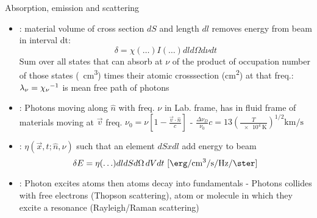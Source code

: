 \begin{frame}{Absorption, emission and scattering}
    \begin{itemize}
        \item {}: material volume of cross section $dS$ and length $dl$ removes energy from beam in interval dt:
            \[\delta=\chi(\ldots)I(\ldots)dld\Omega d\nu dt\]
            Sum over all states that can absorb at $\nu$ of the product of occupation number of those states (\si{\per\cubic\cm}) times their atomic crosssection (\si{\square\cm}) at that freq.: $\lambda_{\nu}={\chi_{\nu}}^{-1}$ is mean free path of photons
        \item {}: Photons moving along $\hat{n}$ with freq. $\nu$ in Lab. frame, has in fluid frame of materials moving at $\vec{v}$ freq. $\nu_0=\nu[1-\frac{\vec{v}\cdot\hat{n}}{c}]$ - $\frac{\Delta\nu_D}{\nu_0}c=13(\frac{T}{\SI{e4}{\kelvin}})^{1/2}\si{\kilo\meter\per\second}$
        \item {}: $\eta(\vec{x},t;\hat{n},\nu)$ such that an element $dSxdl$ add energy to beam
            \[\delta E=\eta(\ldots)dldSd\Omega\,dVdt\ [\si{\erg\per\cubic\cm\per\second\per\hertz\per\ster}]\]
        \item {}: Photon excites atoms then atoms decay into fundamentals - Photons collides with free electrons (Thopson scattering), atom or molecule in which they excite a resonance (Rayleigh/Raman scattering) 
    \end{itemize}
\end{frame}


